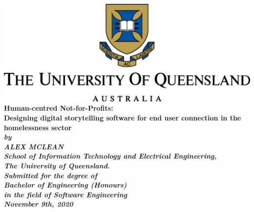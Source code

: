 \begin{titlepage}
    \renewcommand{\baselinestretch}{1.0}
    \begin{center}
        \includegraphics{assets/uq.png}\\
        \vspace*{35mm}
        \Huge\bf
        Human-centred Not-for-Profits:\\
        Designing digital storytelling software for end user connection in the homelessness sector\\
        \vspace{20mm}
        \large\sl
        by\\
        ALEX MCLEAN
        \medskip\\
        \rm
        School of Information Technology and Electrical Engineering,\\
        The University of Queensland.\\
        \vspace{30mm}
        Submitted for the degree of\\
        Bachelor of Engineering (Honours)
        \smallskip\\
        \normalsize
        in the field of Software Engineering
        \medskip\\
        \large
        November 9th, 2020
    \end{center}
\end{titlepage}

\cleardoublepage